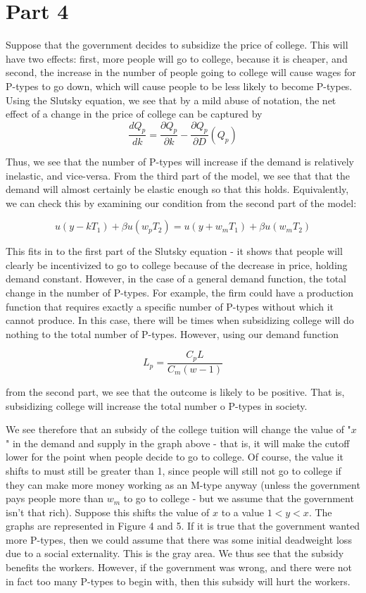 \documentclass[12pt]{article}
\newcommand{\qpartial}[2]{\dfrac{\partial #1}{\partial #2}}
\begin{document}
\begin{enumerate}
\begin{enumerate}
\end{enumerate}

\section*{Part 4}

Suppose that the government decides to subsidize the price of college.  This will have two effects: first, more people will go to college, because it is cheaper, and second, the increase in the number of people going to college will cause wages for P-types to go down, which will cause people to be less likely to become P-types.  Using the Slutsky equation, we see that by a mild abuse of notation, the net effect of a change in the price of college can be captured by 
$$
\dfrac{dQ_p}{dk} = \qpartial{Q_p}{k} - \qpartial{Q_p}{D}(Q_p)
$$

Thus, we see that the number of P-types will increase if the demand is relatively inelastic, and vice-versa.  From the third part of the model, we see that that the demand will almost certainly be elastic enough so that this holds.  Equivalently, we can check this by examining our condition from the second part of the model:

$$
u(y - k T_1) + \beta u(w_p T_2) = u(y + w_m T_1) + \beta u(w_m T_2)
$$

This fits in to the first part of the Slutsky equation - it shows that people will clearly be incentivized to go to college because of the decrease in price, holding demand constant.  However, in the case of a general demand function, the total change in the number of P-types.  For example, the firm could have a production function that requires exactly a specific number of P-types without which it cannot produce.  In this case, there will be times when subsidizing college will do nothing to the total number of P-types.  However, using our demand function

$$
L_p = \frac{C_p L}{C_m(w - 1)}
$$

from the second part, we see that the outcome is likely to be positive.  That is, subsidizing college will increase the total number o P-types in society.  

We see therefore that an subsidy of the college tuition will change the value of "$x$" in the demand and supply in the graph above - that is, it will make the cutoff lower for the point when people decide to go to college.  Of course, the value it shifts to must still be greater than 1, since people will still not go to college if they can make more money working as an M-type anyway (unless the government pays people more than $w_m$ to go to college - but we assume that the government isn't that rich).  Suppose this shifts the value of $x$ to a value $1 < y < x$.  The graphs are represented in Figure 4 and 5.  If it is true that the government wanted more P-types, then we could assume that there was some initial deadweight loss due to a social externality.  This is the gray area.  We thus see that the subsidy benefits the workers.  However, if the government was wrong, and there were not in fact too many P-types to begin with, then this subsidy will hurt the workers. 




\end{enumerate}
\end{document}
